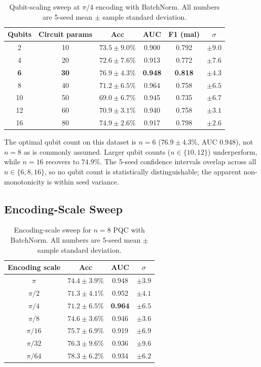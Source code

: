 \documentclass[conference]{IEEEtran}
\begin{document}
\begin{table}[h]
\centering
\caption{Qubit-scaling sweep at $\pi/4$ encoding with BatchNorm. All numbers are 5-seed mean $\pm$ sample standard deviation.}
\label{tab:qubits}
\begin{tabular}{cccccc}
\toprule
\textbf{Qubits} & \textbf{Circuit params} & \textbf{Acc} & \textbf{AUC} & \textbf{F1 (mal)} & $\sigma$ \\
\midrule
2  & 10 & $73.5 \pm 9.0\%$  & 0.900 & 0.792 & $\pm 9.0$ \\
4  & 20 & $72.6 \pm 7.6\%$  & 0.913 & 0.772 & $\pm 7.6$ \\
\textbf{6}  & \textbf{30} & $\mathbf{76.9 \pm 4.3\%}$  & \textbf{0.948} & \textbf{0.818} & $\pm 4.3$ \\
8  & 40 & $71.2 \pm 6.5\%$  & 0.964 & 0.758 & $\pm 6.5$ \\
10 & 50 & $69.0 \pm 6.7\%$  & 0.945 & 0.735 & $\pm 6.7$ \\
12 & 60 & $70.9 \pm 3.1\%$  & 0.940 & 0.758 & $\pm 3.1$ \\
16 & 80 & $74.9 \pm 2.6\%$  & 0.917 & 0.798 & $\pm 2.6$ \\
\bottomrule
\end{tabular}
\end{table}

The optimal qubit count on this dataset is $n = 6$ ($76.9 \pm 4.3\%$, AUC 0.948), not $n = 8$ as is commonly assumed. Larger qubit counts ($n \in \{10, 12\}$) underperform, while $n = 16$ recovers to $74.9\%$. The 5-seed confidence intervals overlap across all $n \in \{6, 8, 16\}$, so no qubit count is statistically distinguishable; the apparent non-monotonicity is within seed variance.

\subsection{Encoding-Scale Sweep}

\begin{table}[h]
\centering
\caption{Encoding-scale sweep for $n = 8$ PQC with BatchNorm. All numbers are 5-seed mean $\pm$ sample standard deviation.}
\label{tab:enc_scale}
\begin{tabular}{cccc}
\toprule
\textbf{Encoding scale} & \textbf{Acc} & \textbf{AUC} & $\sigma$ \\
\midrule
$\pi$       & $74.4 \pm 3.9\%$ & 0.948 & $\pm 3.9$ \\
$\pi/2$     & $71.3 \pm 4.1\%$ & 0.952 & $\pm 4.1$ \\
$\pi/4$     & $71.2 \pm 6.5\%$ & \textbf{0.964} & $\pm 6.5$ \\
$\pi/8$     & $74.6 \pm 3.6\%$ & 0.946 & $\pm 3.6$ \\
$\pi/16$    & $75.7 \pm 6.9\%$ & 0.919 & $\pm 6.9$ \\
$\pi/32$    & $76.3 \pm 9.6\%$ & 0.936 & $\pm 9.6$ \\
$\pi/64$    & $\mathbf{78.3 \pm 6.2\%}$ & 0.934 & $\pm 6.2$ \\
\bottomrule
\end{tabular}
\end{table}
\end{document}
